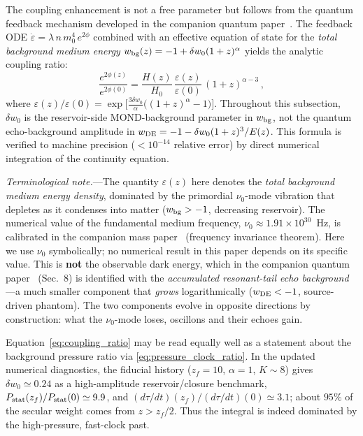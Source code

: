 \documentclass[11pt]{article}
\begin{document}
The coupling enhancement is not a free parameter but follows
from the quantum feedback mechanism developed in the companion
quantum paper~\cite{Lotishvili2026Q}.  The feedback ODE
$\dot\varepsilon=\lambda\,n\,m_0^4\,e^{2\phi}$
combined with an effective equation of state for the
\emph{total background medium energy}
$w_{\rm bg}(z)=-1+\delta w_0(1+z)^\alpha$ yields the analytic
coupling ratio:
\begin{equation}\label{eq:coupling_ratio}
  \frac{e^{2\phi(z)}}{e^{2\phi(0)}}
  = \frac{H(z)}{H_0}\,
    \frac{\varepsilon(z)}{\varepsilon(0)}\,
    (1+z)^{\alpha-3}\,,
\end{equation}
where
$\varepsilon(z)/\varepsilon(0)
=\exp\!\bigl[\tfrac{3\delta w_0}{\alpha}\bigl((1+z)^\alpha-1\bigr)\bigr]$.
Throughout this subsection, $\delta w_0$ is the
reservoir-side MOND-background parameter in $w_{\rm bg}$,
not the quantum echo-background amplitude in
$w_{\rm DE}=-1-\delta w_0(1+z)^3/E(z)$.
This formula is verified to machine precision
($<10^{-14}$ relative error) by direct numerical integration
of the continuity equation.

\textit{Terminological note.}---The quantity $\varepsilon(z)$
here denotes the \emph{total background medium energy density},
dominated by the primordial $\nu_0$-mode vibration that depletes
as it condenses into matter ($w_{\rm bg} > -1$, decreasing
reservoir).  The numerical value of the fundamental medium
frequency, $\nu_0 \approx 1.91 \times 10^{30}$~Hz, is calibrated
in the companion mass paper~\cite{Lotishvili2026Mass} (frequency
invariance theorem).  Here we use $\nu_0$ symbolically; no
numerical result in this paper depends on its specific value.  This is \textbf{not} the observable dark energy,
which in the companion quantum paper~\cite{Lotishvili2026Q}
(Sec.~8) is identified with the \emph{accumulated resonant-tail
echo background}---a much smaller component that \emph{grows}
logarithmically ($w_{\rm DE} < -1$, source-driven phantom).
The two components evolve in opposite directions by
construction: what the $\nu_0$-mode loses, oscillons and
their echoes gain.

Equation~\eqref{eq:coupling_ratio} may be read equally well as
a statement about the background pressure ratio via
\eqref{eq:pressure_clock_ratio}.  In the updated numerical
diagnostics, the fiducial history
($z_f=10$, $\alpha=1$, $K\sim 8$) gives
$\delta w_0\simeq 0.24$ as a high-amplitude reservoir/closure
benchmark,
$P_{\rm stat}(z_f)/P_{\rm stat}(0)\simeq 9.9$, and
$(d\tau/dt)(z_f)/(d\tau/dt)(0)\simeq 3.1$; about $95\%$ of the
secular weight comes from $z>z_f/2$.  Thus the integral is
indeed dominated by the high-pressure, fast-clock past.
\end{document}
